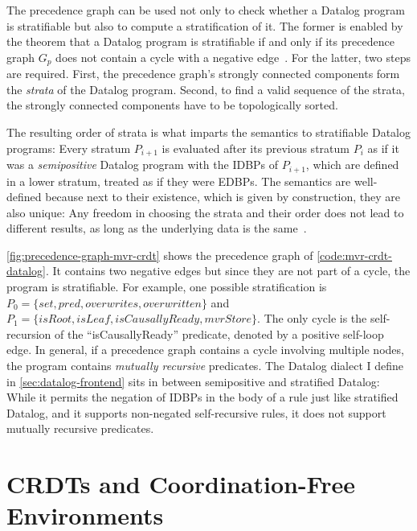 The precedence graph can be used not only to check whether a Datalog
program is stratifiable but also to compute a stratification of it.
The former is enabled by the theorem that a Datalog program is stratifiable
if and only if its precedence graph \(G_p\) does not contain a cycle
with a negative edge~\cite{green2013datalog}.
For the latter, two steps are required.
First, the precedence graph's strongly connected components form the
\emph{strata} of the Datalog program.
Second, to find a valid sequence of the strata,
the strongly connected components have to be topologically sorted.

The resulting order of strata is what imparts the semantics to stratifiable
Datalog programs:
Every stratum \(P_{i+1}\) is evaluated after its previous stratum \(P_{i}\)
as if it was a \emph{semipositive} Datalog program with the \acp{IDBP}
of \(P_{i+1}\), which are defined in a lower stratum,
treated as if they were \acp{EDBP}.
The semantics are well-defined because next to their existence,
which is given by construction, they are also unique: Any freedom
in choosing the strata and their order does not lead to different results,
as long as the underlying data is the same~\cite{apt1988towards}.



\ref{fig:precedence-graph-mvr-crdt} shows the precedence graph
of \ref{code:mvr-crdt-datalog}.
It contains two negative edges but since they are not part of a cycle,
the program is stratifiable.
For example, one possible stratification is
\(P_0 = \{\mathit{set}, \mathit{pred}, \mathit{overwrites}, \mathit{overwritten}\}\)
and
\(P_1 = \{\mathit{isRoot}, \mathit{isLeaf}, \mathit{isCausallyReady}, \mathit{mvrStore}\}\).
The only cycle is the self-recursion of the ``isCausallyReady'' predicate,
denoted by a positive self-loop edge.
In general, if a precedence graph contains a cycle involving multiple nodes,
the program contains \emph{mutually recursive} predicates.
The Datalog dialect I define in \ref{sec:datalog-frontend} sits in between
semipositive and stratified Datalog:
While it permits the negation of \acp{IDBP} in the body of a rule just like
stratified Datalog, and it supports non-negated self-recursive rules,
it does not support mutually recursive predicates.

\section{\acsp{CRDT} and Coordination-Free Environments}\label{sec:crdt-coordination-free}

